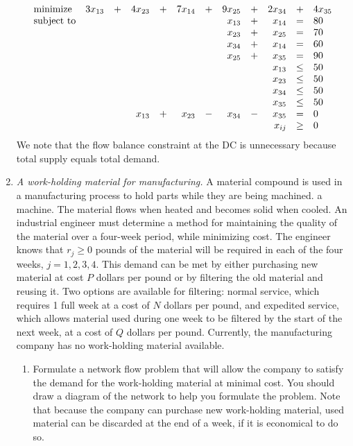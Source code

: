 \begin{enumerate}
\begin{solution}
\[
\begin{array}{lrrrrrrrrrrl}
\textrm{minimize} & 3x_{13} &+& 4x_{23} &+& 7x_{14} &+& 9x_{25} &+& 2x_{34} &+& 4x_{35} \\
\textrm{subject to} &&&&&&& x_{13} &+& x_{14} &=& 80\\
&&&&&&& x_{23} &+& x_{25} &=& 70\\
&&&&&&& x_{34} &+& x_{14} &=& 60\\
&&&&&&& x_{25} &+& x_{35} &=& 90\\
&&&&&&&&& x_{13} & \leq & 50\\
&&&&&&&&& x_{23} & \leq & 50\\
&&&&&&&&& x_{34} & \leq & 50\\
&&&&&&&&& x_{35} & \leq & 50\\
&&& x_{13} &+& x_{23} &-& x_{34} &-& x_{35} &=& 0\\
\multicolumn{10}{r}{x_{ij}} & \geq & 0
\end{array}
\]
We note that the flow balance constraint at the DC is unnecessary
because total supply equals total demand.
\end{solution}

\item \emph{A work-holding material for manufacturing.}  A material
compound
   is used in a manufacturing process to hold parts while
they are being machined.
  a machine. The material flows when heated and becomes solid when
  cooled. An industrial engineer must determine a method for
  maintaining the quality of the material over a four-week period,
  while minimizing cost. The engineer knows that $r_j \geq 0$ pounds
  of the material will be required in each of the four weeks,
  $j = 1, 2, 3, 4$. This demand can be met by either purchasing new
  material at cost $P$ dollars per pound or by filtering the old
  material and reusing it.  Two options are available for filtering:
   normal service, which requires 1 full week at a cost
  of $N$ dollars per pound, and expedited service, which allows
  material used during one week to be filtered by the start of the
  next week, at a cost of $Q$ dollars per pound. Currently, the
  manufacturing company has no work-holding material available.

\begin{enumerate}
\item Formulate a network flow problem that will allow the company to
  satisfy the demand for the work-holding material at minimal cost.
  You should draw a diagram of the network to help you formulate the
  problem. Note that because the company can purchase new work-holding
  material, used material can be discarded at the end of a week, if it
  is economical to do so.
	

\end{enumerate}
\end{enumerate}
